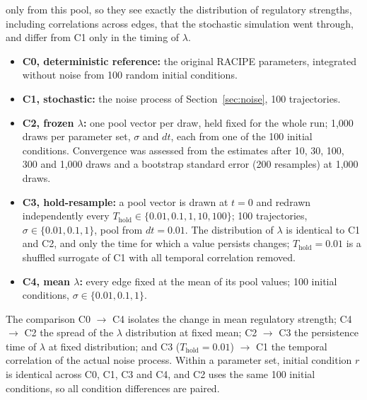 \documentclass[11pt]{article}
\providecommand{\DIFaddtex}[1]{{\protect\color{red}#1}} %
\providecommand{\DIFdeltex}[1]{} %
\providecommand{\DIFaddbegin}{} %
\providecommand{\DIFaddend}{} %
\providecommand{\DIFdelbegin}{} %
\providecommand{\DIFdelend}{} %
\providecommand{\DIFadd}[1]{\texorpdfstring{\DIFaddtex{#1}}{#1}} %
\providecommand{\DIFdel}[1]{\texorpdfstring{\DIFdeltex{#1}}{}} %
\providecommand{\DIFaddincludegraphics}[2][]{\DIFOincludegraphics[#1]{#2}} %
\providecommand{\DIFdelincludegraphics}[2][]{}
\DeclareRobustCommand{\DIFaddbegin}{\DIFOaddbegin \let\includegraphics\DIFaddincludegraphics} %
\DeclareRobustCommand{\DIFaddend}{\DIFOaddend \let\includegraphics\DIFOincludegraphics} %
\DeclareRobustCommand{\DIFdelbegin}{\DIFOdelbegin \let\includegraphics\DIFdelincludegraphics} %
\DeclareRobustCommand{\DIFdelend}{\DIFOaddend \let\includegraphics\DIFOincludegraphics} %
\begin{document}
\DIFdel{), and the corresponding deterministic steady state was solved; this was repeated over 10 resampled }\DIFdelend \DIFaddbegin \DIFadd{only from this pool, so they see exactly the distribution of regulatory strengths, including correlations across edges, that the stochastic simulation went through, and differ from C1 only in the timing of $\lambda$.
}\begin{itemize}
  \item \textbf{\DIFadd{C0, deterministic reference:}} \DIFadd{the original RACIPE parameters, integrated without noise from 100 random initial conditions.
  }\item \textbf{\DIFadd{C1, stochastic:}} \DIFadd{the noise process of Section~\ref{sec:noise}, 100 trajectories.
  }\item \textbf{\DIFadd{C2, frozen $\lambda$:}} \DIFadd{one pool vector per draw, held fixed for the whole run; 1,000 }\DIFaddend draws per parameter set, \DIFaddbegin \DIFadd{$\sigma$ and $dt$, each from one of the 100 initial conditions. Convergence was assessed from the estimates after 10, 30, 100, 300 }\DIFaddend and \DIFdelbegin \DIFdel{the resulting basin-occupancy fractions (MRT$_{\text{det}}$) were compared directly against the stochastic MRT from the same parameter set}\DIFdelend \DIFaddbegin \DIFadd{1,000 draws and a bootstrap standard error (200 resamples) at 1,000 draws.
  }\item \textbf{\DIFadd{C3, hold-resample:}} \DIFadd{a pool vector is drawn at $t = 0$ and redrawn independently every $T_\text{hold} \in \{0.01, 0.1, 1, 10, 100\}$; 100 trajectories, $\sigma \in \{0.01, 0.1, 1\}$, pool from $dt = 0.01$. The distribution of $\lambda$ is identical to C1 }\DIFaddend and \DIFdelbegin \DIFdel{noise level}\DIFdelend \DIFaddbegin \DIFadd{C2, and only the time for which a value persists changes; $T_\text{hold} = 0.01$ is a shuffled surrogate of C1 with all temporal correlation removed.
  }\item \textbf{\DIFadd{C4, mean $\lambda$:}} \DIFadd{every edge fixed at the mean of its pool values; 100 initial conditions, $\sigma \in \{0.01, 0.1, 1\}$}\DIFaddend .
\DIFaddbegin \end{itemize}
\DIFadd{The comparison C0 $\to$ C4 isolates the change in mean regulatory strength; C4 $\to$ C2 the spread of the $\lambda$ distribution at fixed mean; C2 $\to$ C3 the persistence time of $\lambda$ at fixed distribution; and C3 ($T_\text{hold} = 0.01$) $\to$ C1 the temporal correlation of the actual noise process. Within a parameter set, initial condition $r$ is identical across C0, C1, C3 and C4, and C2 uses the same 100 initial conditions, so all condition differences are paired.
}\DIFaddend 
\end{document}
